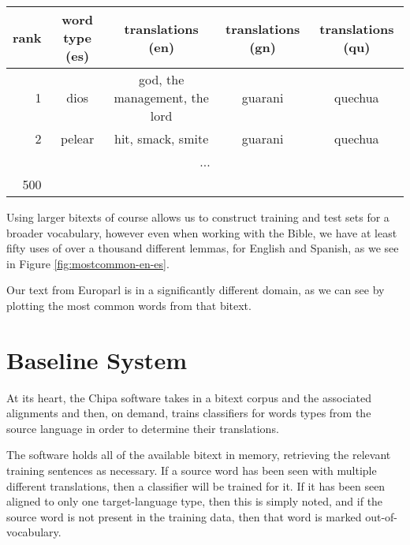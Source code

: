 \begin{figure*}
\begin{tiny}
\begin{centering}
\begin{tabular}{|r|c|c|}
  \end{tabular}
  \end{centering}
  \end{tiny}
  \caption{Some of the most common (lemmatized, non-stopword) word types in our
  English and Spanish Bibles}
  \label{fig:mostcommon-en-es}
\end{figure*}

\begin{figure*}
  \begin{centering}
  \begin{tabular}{|r|c|c|c|c|}
    \hline
    rank & word type (es) & translations (en) & translations (gn) & translations (qu) \\
    \hline
    1    & dios   &  god, the management, the lord & guarani & quechua \\
    2    & pelear &  hit, smack, smite             & guarani & quechua \\
    \multicolumn{5}{|c|}{...} \\ 
    500 &  & & & \\
    \hline
  \end{tabular}
  \end{centering}
  \caption{Most common (lemmatized, non-stopword) word types in our English and
  Spanish Bibles}
  \label{fig:mostcommon-es-translations}
\end{figure*}

Using larger bitexts of course allows us to construct training and test sets
for a broader vocabulary, however even when working with the Bible, we have
at least fifty uses of over a thousand different lemmas, for English and
Spanish, as we see in Figure \ref{fig:mostcommon-en-es}.

Our text from Europarl is in a significantly different domain, as we can see by
plotting the most common words from that bitext.

\section{Baseline System}

At its heart, the Chipa software takes in a bitext corpus and the associated
alignments and then, on demand, trains classifiers for words types from the
source language in order to determine their translations.

The software holds all of the available bitext in memory, retrieving the
relevant training sentences as necessary.
If a source word has been seen with multiple different translations, then a
classifier will be trained for it. If it has been seen aligned to only one
target-language type, then this is simply noted, and if the source word is not
present in the training data, then that word is marked out-of-vocabulary.

